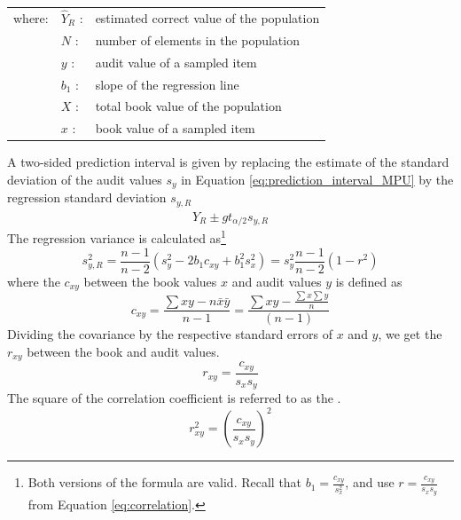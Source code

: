 \noindent
\begin{tabularx}{\textwidth}{@{}llX@{}}
where: & $\hat{Y}_R$ : & estimated correct value of the population\\
       & $N$         : & number of elements in the population\\
       & $y$         : & audit value of a sampled item\\
       & $b_1$       : & slope of the regression line\\
       & $X$         : & total book value of the population\\
       & $x$         : & book value of a sampled item\\
\end{tabularx}

\bigskip
A two-sided prediction interval is given by replacing the estimate of the standard deviation of the audit values $s_y$ in Equation \ref{eq:prediction_interval_MPU} by the regression standard deviation $s_{y, R}$
\begin{equation}
	\hat{Y}_R \pm g t_{\alpha/2} s_{y, R}
\label{eq:pred_interval_regression}
\end{equation}
The regression variance is calculated as\footnote{Both versions of the formula are valid. Recall that $b_1 = \frac{c_{xy}}{s_x^2}$, and use $r = \frac{c_{xy}}{s_x s_y}$ from Equation \ref{eq:correlation}.}
\begin{equation}
	s_{y, R}^2 = \frac{n - 1}{n - 2}(s_y^2 - 2 b_1 c_{xy} + b_1^2 s_x^2) = s_y^2 \frac{n - 1}{n - 2} (1 - r^2)
\label{eq:variance_regression}
\end{equation}
where the  $c_{xy}$ between the book values $x$ and audit values $y$ is defined as 
\begin{equation}
c_{xy} = \frac{\sum{x y} - n \bar{x} \bar{y}}{n - 1}= \frac{\sum{xy} - \frac{\sum{x}\sum{y}}{n}}{(n - 1)}
\label{eq:covariance}
\end{equation}
Dividing the covariance by the respective standard errors of $x$ and $y$, we get the  $r_{xy}$ between the book and audit values.
\begin{equation}
r_{xy} = \frac{c_{xy}}{s_{x} s_{y}}
\label{eq:correlation}
\end{equation}
The square of the correlation coefficient is referred to as the .
\begin{equation}
r^2_{xy} = \left( \frac{c_{xy}}{s_{x} s_{y}} \right)^2
\label{eq:coefficient_of_determination}
\end{equation}

